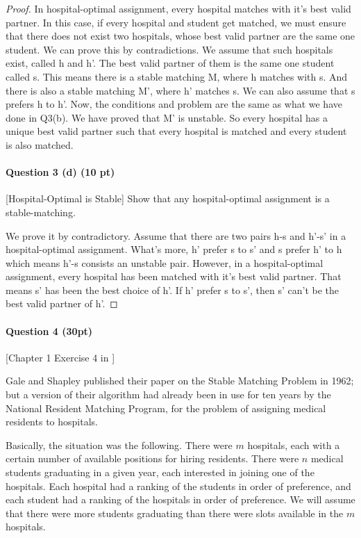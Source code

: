 \begin{proof}
In hospital-optimal assignment, every hospital matches with it's best valid partner. In this case, if every hospital and student get matched, we must ensure that there does not exist two hospitals, whose best valid partner are the same one student. We can prove this by contradictions. We assume that such hospitals exist, called h and h'. The best valid partner of them is the same one student called s. This means there is a stable matching M, where h matches with s. And there is also a stable matching M', where h' matches s. We can also assume that s prefers h to h'. Now, the conditions and problem are the same as what we have done in Q3(b). We have proved that M' is unstable. So every hospital has a unique best valid partner such that every hospital is matched and every student is also matched.

\medskip


\paragraph*{Question 3 (d) (10 pt)} [Hospital-Optimal is Stable] Show that any hospital-optimal assignment is a stable-matching.

We prove it by contradictory. Assume that there are two pairs h-s and h'-s' in a hospital-optimal assignment. What's more, h' prefer s to s' and s prefer h' to h which means h'-s consists an unstable pair. However, in a hospital-optimal assignment, every hospital has been matched with it's best valid partner. That means s' has been the best choice of h'. If h' prefer s to s', then s' can't be the best valid partner of h'.

\medskip

\end{proof}


\pagebreak

\paragraph*{Question 4 (30pt)} [Chapter 1 Exercise 4 in \cite{KT05}]

Gale and Shapley published their paper on the Stable Matching Problem  in 1962; but a version of their algorithm had already been in use for ten years by the National Resident Matching Program, for the problem of assigning medical residents to hospitals.

Basically, the situation was the following. There were $m$ hospitals,  each with a certain number of available positions for hiring residents. There were $n$ medical students graduating in a given year, each interested in joining one of the hospitals. Each hospital had a ranking of the students  in order of preference, and each student had a ranking of the hospitals  in order of preference. We will assume that there were more students  graduating than there were slots available in the $m$ hospitals.

